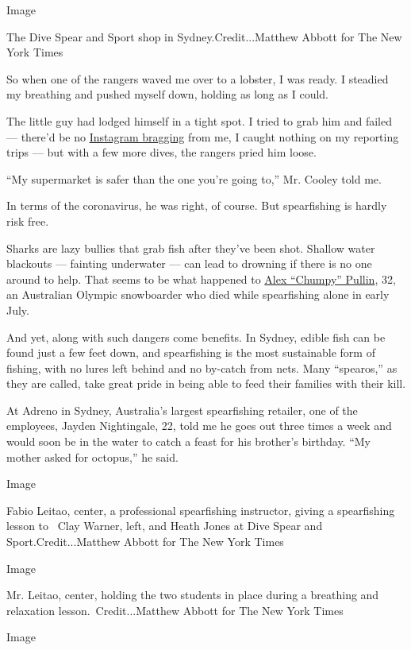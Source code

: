 Image

The Dive Spear and Sport shop in Sydney.Credit...Matthew Abbott for The
New York Times

So when one of the rangers waved me over to a lobster, I was ready. I
steadied my breathing and pushed myself down, holding as long as I
could.

The little guy had lodged himself in a tight spot. I tried to grab him
and failed --- there'd be no
\href{https://www.instagram.com/p/CDGWKvipsWg/}{Instagram bragging} from
me, I caught nothing on my reporting trips --- but with a few more
dives, the rangers pried him loose.

``My supermarket is safer than the one you're going to,'' Mr. Cooley
told me.

In terms of the coronavirus, he was right, of course. But spearfishing
is hardly risk free.

Sharks are lazy bullies that grab fish after they've been shot. Shallow
water blackouts --- fainting underwater --- can lead to drowning if
there is no one around to help. That seems to be what happened to
\href{https://au.sports.yahoo.com/alex-chumpy-pullin-death-shallow-water-blackout-explained-020035708.html}{Alex
``Chumpy'' Pullin}, 32, an Australian Olympic snowboarder who died while
spearfishing alone in early July.

And yet, along with such dangers come benefits. In Sydney, edible fish
can be found just a few feet down, and spearfishing is the most
sustainable form of fishing, with no lures left behind and no by-catch
from nets. Many ``spearos,'' as they are called, take great pride in
being able to feed their families with their kill.

At Adreno in Sydney, Australia's largest spearfishing retailer, one of
the employees, Jayden Nightingale, 22, told me he goes out three times a
week and would soon be in the water to catch a feast for his brother's
birthday. ``My mother asked for octopus,'' he said.

Image

Fabio Leitao, center, a professional spearfishing instructor, giving a
spearfishing~ lesson to~ Clay Warner, left, and Heath Jones at Dive
Spear and Sport.Credit...Matthew Abbott for The New York Times

Image

Mr. Leitao, center, holding the two students in place during a breathing
and relaxation lesson.~Credit...Matthew Abbott for The New York Times

Image

